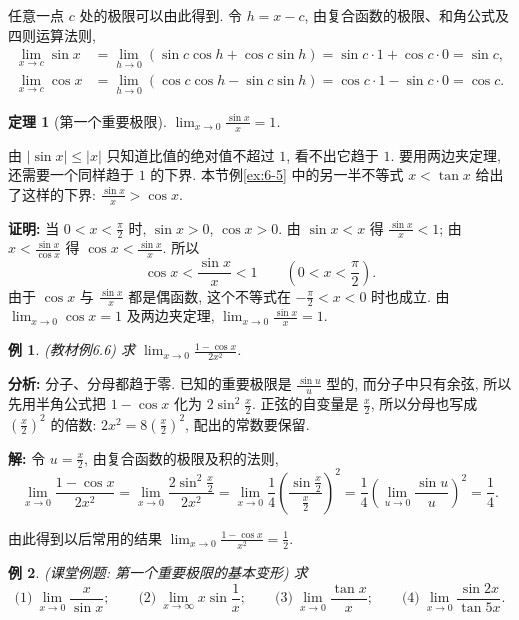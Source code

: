 \documentclass[UTF8,openany]{ctexbook}
\theoremstyle{chinesetextbook}
\newtheorem{example}{例}[section]
\newtheorem{theorem}{定理}[section]
\newenvironment{cnproof}{\par\indent\textbf{证明:} \ignorespaces}{\par}
\newenvironment{cnsolution}{\par\indent\textbf{解:} \ignorespaces}{\par}
\begin{document}
任意一点 $c$ 处的极限可以由此得到. 令 $h=x-c$, 由复合函数的极限、和角公式及四则运算法则,
\[
\begin{aligned}
\lim_{x\to c}\sin x&=\lim_{h\to0}(\sin c\cos h+\cos c\sin h)=\sin c\cdot1+\cos c\cdot0=\sin c,\\
\lim_{x\to c}\cos x&=\lim_{h\to0}(\cos c\cos h-\sin c\sin h)=\cos c\cdot1-\sin c\cdot0=\cos c.
\end{aligned}
\]
\begin{theorem}[第一个重要极限]
$\displaystyle\lim_{x\to0}\frac{\sin x}x=1$.
\end{theorem}
由 $|\sin x|\le|x|$ 只知道比值的绝对值不超过 $1$, 看不出它趋于 $1$. 要用两边夹定理, 还需要一个同样趋于 $1$ 的下界. 本节例\ref{ex:6-5} 中的另一半不等式 $x<\tan x$ 给出了这样的下界: $\displaystyle\frac{\sin x}x>\cos x$.
\begin{cnproof}
当 $\displaystyle0<x<\frac\pi2$ 时, $\sin x>0$, $\cos x>0$. 由 $\sin x<x$ 得 $\displaystyle\frac{\sin x}x<1$; 由 $\displaystyle x<\frac{\sin x}{\cos x}$ 得 $\displaystyle\cos x<\frac{\sin x}x$. 所以
\[
\cos x<\frac{\sin x}x<1\qquad\left(0<x<\frac\pi2\right).
\]
由于 $\cos x$ 与 $\displaystyle\frac{\sin x}x$ 都是偶函数, 这个不等式在 $\displaystyle-\frac\pi2<x<0$ 时也成立. 由 $\displaystyle\lim_{x\to0}\cos x=1$ 及两边夹定理, $\displaystyle\lim_{x\to0}\frac{\sin x}x=1$.
\end{cnproof}
\begin{example}\label{ex:6-6}
\textnormal{(教材例6.6)} 求 $\displaystyle\lim_{x\to0}\frac{1-\cos x}{2x^2}$.
\end{example}
\par\indent\textbf{分析:} 分子、分母都趋于零. 已知的重要极限是 $\displaystyle\frac{\sin u}u$ 型的, 而分子中只有余弦, 所以先用半角公式把 $1-\cos x$ 化为 $\displaystyle2\sin^2\frac x2$. 正弦的自变量是 $\displaystyle\frac x2$, 所以分母也写成 $\displaystyle\left(\frac x2\right)^2$ 的倍数: $\displaystyle2x^2=8\left(\frac x2\right)^2$, 配出的常数要保留.
\begin{cnsolution}
令 $\displaystyle u=\frac x2$, 由复合函数的极限及积的法则,
\[
\lim_{x\to0}\frac{1-\cos x}{2x^2}=\lim_{x\to0}\frac{2\sin^2\frac x2}{2x^2}=\lim_{x\to0}\frac14\left(\frac{\sin\frac x2}{\frac x2}\right)^2=\frac14\left(\lim_{u\to0}\frac{\sin u}u\right)^2=\frac14.
\]
\end{cnsolution}
由此得到以后常用的结果 $\displaystyle\lim_{x\to0}\frac{1-\cos x}{x^2}=\frac12$.
\begin{example}
\textnormal{(课堂例题: 第一个重要极限的基本变形)} 求
\[
\text{(1)}\ \lim_{x\to0}\frac x{\sin x};\qquad\text{(2)}\ \lim_{x\to\infty}x\sin\frac1x;\qquad\text{(3)}\ \lim_{x\to0}\frac{\tan x}x;\qquad\text{(4)}\ \lim_{x\to0}\frac{\sin2x}{\tan5x}.
\]
\end{example}
\end{document}
